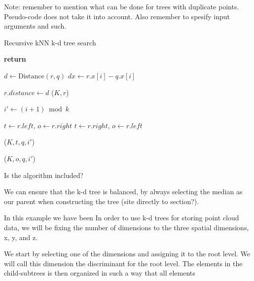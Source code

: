 Note: remember to mention what can be done for trees with duplicate points. Pseudo-code does not take it into account. Also remember to spesify input arguments and such.

\begin{algorithm}
\caption{Recursive kNN k-d tree search}
\label{alg:recursive_knn_kd_tree_search}
\begin{algorithmic}
         
            \State \textbf{return} 
        \EndIf

        \State $d \gets \text{Distance}(r, q)$
        \State $dx \gets r.x[i] - q.x[i]$

         
            \State $r.distance \gets d$
            \State {}($K, r$)
        \EndIf

        \State $i' \gets (i + 1) \bmod k$ 

          
            \State $t \gets r.left$, $o \gets r.right$
        \Else
            \State $t \gets r.right$, $o \gets r.left$
        \EndIf

        \State {}($K, t, q, i'$)

         
            \State {}($K, o, q, i'$)
        \EndIf
    \EndProcedure
\end{algorithmic}
\end{algorithm}

Is the algorithm included?


We can ensure that the k-d tree is balanced, by always selecting the median as our parent when constructing the tree \cite{Bentley:1975:MBS:361002.361007} (site directly to section?).



In this example we have been In order to use k-d trees for storing point cloud data, we will be fixing the number of dimensions to the three spatial dimensions, x, y, and z.

We start by selecting one of the dimensions and assigning it to the root level. We will call this dimension the discriminant for the root level. The elements in the child-subtrees is then organized in such a way that all elements

